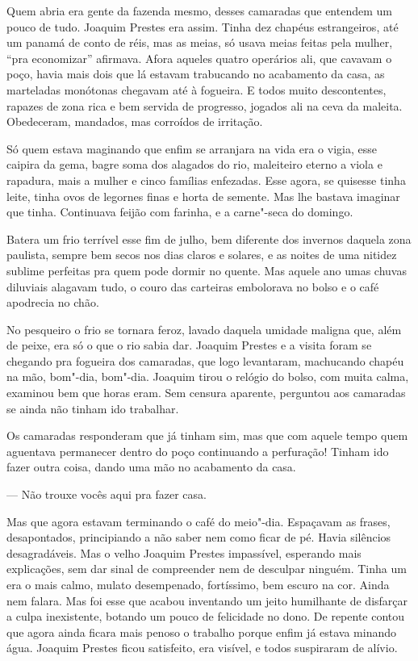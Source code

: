 Quem abria era gente da fazenda mesmo, desses camaradas que entendem um
pouco de tudo. Joaquim Prestes era assim. Tinha dez chapéus
estrangeiros, até um panamá de conto de réis, mas as meias, só usava
meias feitas pela mulher, ``pra economizar'' afirmava. Afora aqueles
quatro operários ali, que cavavam o poço, havia mais dois que lá estavam
trabucando no acabamento da casa, as marteladas monótonas chegavam até à
fogueira. E todos muito descontentes, rapazes de zona rica e bem servida
de progresso, jogados ali na ceva da maleita. Obedeceram, mandados, mas
corroídos de irritação.

Só quem estava maginando que enfim se arranjara na vida era o vigia,
esse caipira da gema, bagre soma dos alagados do rio, maleiteiro eterno
a viola e rapadura, mais a mulher e cinco famílias enfezadas. Esse
agora, se quisesse tinha leite, tinha ovos de legornes finas e horta de
semente. Mas lhe bastava imaginar que tinha. Continuava feijão com
farinha, e a carne"-seca do domingo.

Batera um frio terrível esse fim de julho, bem diferente dos invernos
daquela zona paulista, sempre bem secos nos dias claros e solares, e as
noites de uma nitidez sublime perfeitas pra quem pode dormir no quente.
Mas aquele ano umas chuvas diluviais alagavam tudo, o couro das
carteiras embolorava no bolso e o café apodrecia no chão.

No pesqueiro o frio se tornara feroz, lavado daquela umidade maligna
que, além de peixe, era só o que o rio sabia dar. Joaquim Prestes e a
visita foram se chegando pra fogueira dos camaradas, que logo
levantaram, machucando chapéu na mão, bom"-dia, bom"-dia. Joaquim tirou o
relógio do bolso, com muita calma, examinou bem que horas eram. Sem
censura aparente, perguntou aos camaradas se ainda não tinham ido
trabalhar.

Os camaradas responderam que já tinham sim, mas que com aquele tempo
quem aguentava permanecer dentro do poço continuando a perfuração!
Tinham ido fazer outra coisa, dando uma mão no acabamento da casa.

--- Não trouxe vocês aqui pra fazer casa.

Mas que agora estavam terminando o café do meio"-dia. Espaçavam as
frases, desapontados, principiando a não saber nem como ficar de pé.
Havia silêncios desagradáveis. Mas o velho Joaquim Prestes impassível,
esperando mais explicações, sem dar sinal de compreender nem de
desculpar ninguém. Tinha um era o mais calmo, mulato desempenado,
fortíssimo, bem escuro na cor. Ainda nem falara. Mas foi esse que acabou
inventando um jeito humilhante de disfarçar a culpa inexistente, botando
um pouco de felicidade no dono. De repente contou que agora ainda ficara
mais penoso o trabalho porque enfim já estava minando água. Joaquim
Prestes ficou satisfeito, era visível, e todos suspiraram de alívio.

